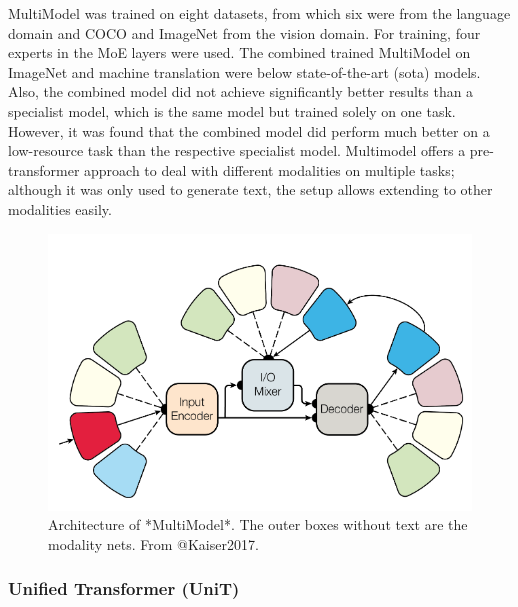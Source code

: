 \documentclass[
]{krantz}
\begin{document}
MultiModel was trained on eight datasets, from which six were from the language domain and COCO \citep{mccoco} and ImageNet \citep{ImageNet} from the vision domain. For training, four experts in the MoE layers were used. The combined trained MultiModel on ImageNet and machine translation were below state-of-the-art (sota) models. Also, the combined model did not achieve significantly better results than a specialist model, which is the same model but trained solely on one task. However, it was found that the combined model did perform much better on a low-resource task than the respective specialist model.
Multimodel offers a pre-transformer approach to deal with different modalities on multiple tasks; although it was only used to generate text, the setup allows extending to other modalities easily.

\begin{figure}

{\centering \includegraphics[width=0.8\linewidth]{figures/03-03-multipurpose/multimodel} 

}

\caption{Architecture of *MultiModel*. The outer boxes without text are the modality nets. From @Kaiser2017.}\label{fig:multimodel}
\end{figure}

\hypertarget{unified-transformer-unit}{%
\subsubsection{Unified Transformer (UniT)}\label{unified-transformer-unit}}
\end{document}
